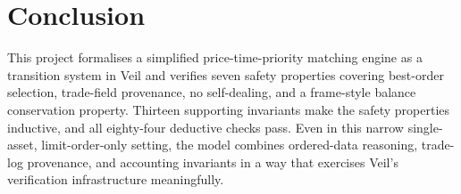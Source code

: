 \section{Conclusion}

This project formalises a simplified price-time-priority matching engine as a
transition system in Veil and verifies seven safety properties covering
best-order selection, trade-field provenance, no self-dealing, and a
frame-style balance conservation property. Thirteen supporting invariants make
the safety properties inductive, and all eighty-four deductive checks pass.
Even in this narrow single-asset, limit-order-only setting, the model combines
ordered-data reasoning, trade-log provenance, and accounting invariants in a
way that exercises Veil's verification infrastructure meaningfully.
